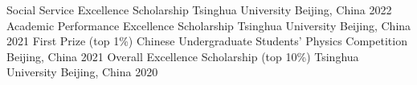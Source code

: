 


\begin{cvhonors}

  \cvhonor
    {Social Service Excellence Scholarship} %
    {Tsinghua University} %
    {Beijing, China} %
    {2022} %
  \cvhonor
    {Academic Performance Excellence Scholarship} %
    {Tsinghua University} %
    {Beijing, China} %
    {2021} %
  \cvhonor
    {First Prize (top 1\%)} %
    {Chinese Undergraduate Students’ Physics Competition} %
    {Beijing, China} %
    {2021} %
  \cvhonor
    {Overall Excellence Scholarship (top 10\%)} %
    {Tsinghua University} %
    {Beijing, China} %
    {2020} %
\end{cvhonors}